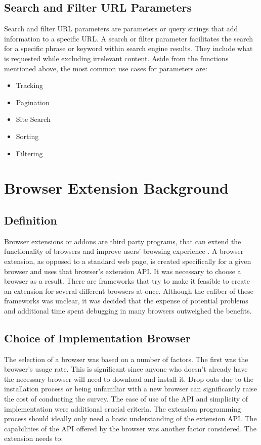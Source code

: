 \subsection{Search and Filter URL Parameters}
Search and filter URL parameters are parameters or query strings that add information to a specific URL. A search or filter parameter facilitates the search for a specific phrase or keyword within search engine results. They include what is requested while excluding irrelevant content. Aside from the functions mentioned above, the most common use cases for parameters are:
\begin{itemize}
  \item Tracking
  \item Pagination
  \item Site Search
  \item Sorting
  \item Filtering
\end{itemize}

\section{Browser Extension Background}

\subsection{Definition}
Browser extensions or addons are third party programs, that can extend the functionality of browsers and improve users' browsing experience \autocite{some2019empoweb}. A browser extension, as opposed to a standard web page, is created specifically for a given browser and uses that browser's extension API. It was necessary to choose a browser as a result. There are frameworks that try to make it feasible to create an extension for several different browsers at once. Although the caliber of these frameworks was unclear, it was decided that the expense of potential problems and additional time spent debugging in many browsers outweighed the benefits.

\subsection{Choice of Implementation Browser}
The selection of a browser was based on a number of factors. The first was the browser's usage rate. This is significant since anyone who doesn't already have the necessary browser will need to download and install it. Drop-outs due to the installation process or being unfamiliar with a new browser can significantly raise the cost of conducting the survey. The ease of use of the API and simplicity of implementation were additional crucial criteria. The extension programming process should ideally only need a basic understanding of the extension API. The capabilities of the API offered by the browser was another factor considered. The extension needs to:

